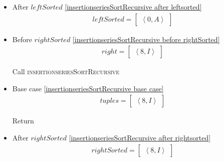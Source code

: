 \begin{frame}[containsverbatim]{\insertionseriesexampleframe}
\begin{columns}[c]
\begin{column}{0.6\textwidth}
{\begin{minipage}[c]{\textwidth}
\begin{multicols}{3}
\begin{itemize}
                                    Return
        
                                    \item After $leftSorted$ \cref{insertionseriesSortRecursive after leftsorted}
                                    \begin{align*}
                                        leftSorted = \begin{bmatrix}\left<0, A\right>\end{bmatrix}
                                    \end{align*}
        
                                    \item Before $rightSorted$ \cref{insertionseriesSortRecursive before rightSorted}
                                    \begin{align*}
                                        right = \begin{bmatrix}\left<8, I\right>\end{bmatrix}
                                    \end{align*}
        
                                    Call \textsc{insertionseriesSortRecursive}
        
                                    \item Base case \cref{insertionseriesSortRecursive base case}
                                    \begin{align*}
                                        tuples = \begin{bmatrix}\left<8, I\right>\end{bmatrix}
                                    \end{align*}
        
                                    Return
        
                                    \item After $rightSorted$ \cref{insertionseriesSortRecursive after rightsorted}
                                    \begin{align*}
                                        rightSorted = \begin{bmatrix}\left<8, I\right>\end{bmatrix}
                                    \end{align*}
        

\end{itemize}
\end{multicols}
\end{minipage}}
\end{column}
\end{columns}
\end{frame}
